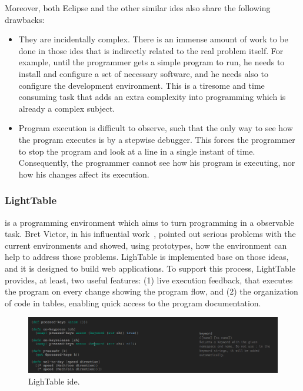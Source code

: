 Moreover, both Eclipse and the other similar \ac{ide}s also share the following drawbacks:
\begin{itemize}
	\item They are incidentally complex. There is an immense amount of work to be done in those \ac{ide}s that is indirectly related to the real problem itself. For example, until the programmer gets a simple program to run, he needs to install and configure a set of necessary software, and he needs also to configure the development environment. This is a tiresome and time consuming task that adds an extra complexity into programming which is already a complex subject.

	\item Program execution is difficult to observe, such that the only way to see how the program executes is by a stepwise debugger. This forces the programmer to stop the program and look at a line in a single instant of time. Consequently, the programmer cannot see how his program is executing, nor how his changes affect its execution.
\end{itemize}
\subsubsection{LightTable} is a programming environment which aims to turn programming in a observable task. Bret Victor, in his influential work~\cite{inventingPrin,learnableProg}, pointed out serious problems with the current environments and showed, using prototypes, how the environment can help to address those problems. LighTable is implemented base on those ideas, and it is designed to build web applications. To support this process, LightTable provides, at least, two useful features: (1) live execution feedback, that executes the program on every change showing the program flow, and (2) the organization of code in tables, enabling quick access to the program documentation.

\begin{figure}[!htbp]
\vspace{-10pt}
  \centering
  \includegraphics[width=1.0\textwidth]{img/lt2}
    \vspace{-15pt}
    \caption{LighTable \ac{ide}.}
    \vspace{-10pt}  
  \label{fig:lt}
\end{figure} 


